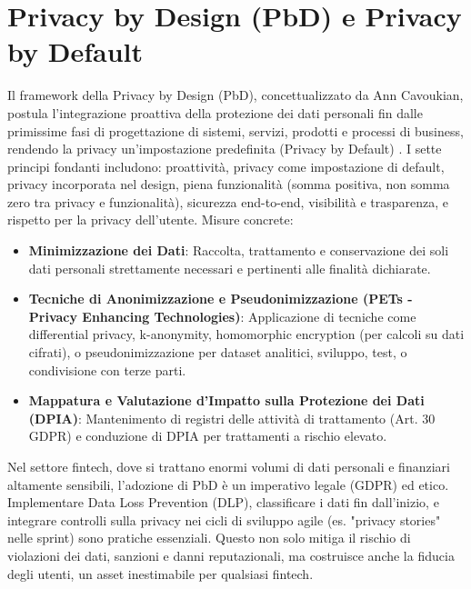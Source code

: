 \section{Privacy by Design (PbD) e Privacy by Default}
Il framework della Privacy by Design (PbD), concettualizzato da Ann Cavoukian, postula l'integrazione proattiva della protezione dei dati personali fin dalle primissime fasi di progettazione di sistemi, servizi, prodotti e processi di business, rendendo la privacy un'impostazione predefinita (Privacy by Default) \cite{Cavoukian_PbD_2009}. I sette principi fondanti includono: proattività, privacy come impostazione di default, privacy incorporata nel design, piena funzionalità (somma positiva, non somma zero tra privacy e funzionalità), sicurezza end-to-end, visibilità e trasparenza, e rispetto per la privacy dell'utente.
Misure concrete:
\begin{itemize}
\item \textbf{Minimizzazione dei Dati}: Raccolta, trattamento e conservazione dei soli dati personali strettamente necessari e pertinenti alle finalità dichiarate.
\item \textbf{Tecniche di Anonimizzazione e Pseudonimizzazione (PETs - Privacy Enhancing Technologies)}: Applicazione di tecniche come differential privacy, k-anonymity, homomorphic encryption (per calcoli su dati cifrati), o pseudonimizzazione per dataset analitici, sviluppo, test, o condivisione con terze parti.
\item \textbf{Mappatura e Valutazione d'Impatto sulla Protezione dei Dati (DPIA)}: Mantenimento di registri delle attività di trattamento (Art. 30 GDPR) e conduzione di DPIA per trattamenti a rischio elevato.
\end{itemize}
Nel settore fintech, dove si trattano enormi volumi di dati personali e finanziari altamente sensibili, l'adozione di PbD è un imperativo legale (GDPR) ed etico. Implementare Data Loss Prevention (DLP), classificare i dati fin dall'inizio, e integrare controlli sulla privacy nei cicli di sviluppo agile (es. "privacy stories" nelle sprint) sono pratiche essenziali. Questo non solo mitiga il rischio di violazioni dei dati, sanzioni e danni reputazionali, ma costruisce anche la fiducia degli utenti, un asset inestimabile per qualsiasi fintech.
